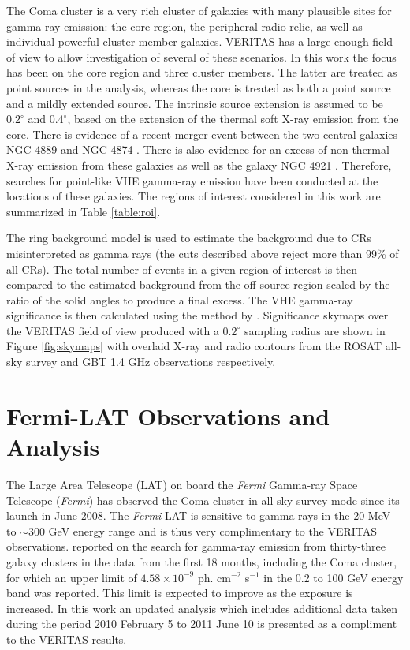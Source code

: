 \documentclass[12pt,manuscript]{aastex}
\begin{document}
The Coma cluster is a very rich cluster of galaxies with many plausible sites for gamma-ray emission: the core region, the peripheral radio relic, as well as individual powerful cluster member galaxies. VERITAS has a large enough field of view to allow investigation of several of these scenarios. In this work the focus has been on the core region and three cluster members. The latter are treated as point sources in the analysis, whereas the core is treated as both a point source and a mildly extended source. The intrinsic source extension is assumed to be $0.2^{\circ}$ and $0.4^{\circ}$, based on the extension of the thermal soft X-ray emission from the core. There is evidence of a recent merger event between the two central galaxies NGC 4889 and NGC 4874 \citep{article:Tribble:1993}. There is also evidence for an excess of non-thermal X-ray emission from these galaxies as well as the galaxy NGC 4921 \citep{article:Neumann_etal:2003}. Therefore, searches for point-like VHE gamma-ray emission have been conducted at the locations of these galaxies. The regions of interest considered in this work are summarized in Table \ref{table:roi}.

The ring background model \citep{article:Aharonian_etal:2001} is used to estimate the background due to CRs misinterpreted as gamma rays (the cuts described above reject more than 99\% of all CRs). The total number of events in a given region of interest is then compared to the estimated background from the off-source region scaled by the ratio of the solid angles to produce a final excess. The VHE gamma-ray significance is then calculated using the method by \citet{article:LiMa:1983}. Significance skymaps over the VERITAS field of view produced with a $0.2^{\circ}$ sampling radius are shown in Figure \ref{fig:skymaps} with overlaid X-ray and radio contours from the ROSAT all-sky survey \citep{article:BrielHenryBohringer:1992}  and GBT 1.4 GHz observations \citep{article:BrownRudnick:2010} respectively.

\section{Fermi-LAT Observations and Analysis}
The Large Area Telescope (LAT) on board the \emph{Fermi} Gamma-ray Space Telescope (\emph{Fermi}) has observed the Coma cluster in all-sky survey mode since its launch in June 2008. The \emph{Fermi}-LAT is sensitive to gamma rays in the 20 MeV to $\sim$300 GeV energy range and is thus very complimentary to the VERITAS observations. \citet{article:Ackermann_etal:2010} reported on the search for gamma-ray emission from thirty-three galaxy clusters in the data from the first 18 months, including the Coma cluster, for which an upper limit of $4.58\times 10^{-9}$ ph. cm$^{-2}$ s$^{-1}$ in the 0.2 to 100 GeV energy band was reported. This limit is expected to improve as the exposure is increased. In this work an updated analysis which includes additional data taken during the period 2010 February 5 to 2011 June 10 is presented as a compliment to the VERITAS results.
\end{document}
